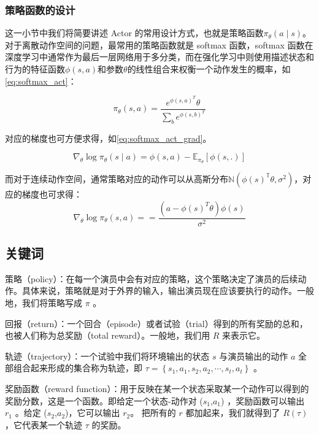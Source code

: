 \subsubsection{策略函数的设计}

这一小节中我们将简要讲述 Actor 的常用设计方式，也就是策略函数$\pi_\theta(a \mid s)$。 对于离散动作空间的问题，最常用的策略函数就是 softmax 函数，softmax 函数在深度学习中通常作为最后一层网络用于多分类，而在强化学习中则使用描述状态和行为的特征函数$\phi(s,a)$和参数$\theta$的线性组合来权衡一个动作发生的概率，如\eqref{eq:softmax_act}：


\begin{equation}
    \label{eq:softmax_act}
    \pi_\theta(s, a)=\frac{e^{\phi(s, a)^T} \theta}{\sum_b e^{\phi(s, b)^T}}
\end{equation}

对应的梯度也可方便求得，如\eqref{eq:softmax_act_grad}。

\begin{equation}
    \label{eq:softmax_act_grad}
    \nabla_\theta \log \pi_\theta(s \mid a)=\phi(s, a)-\mathbb{E}_{\pi_\theta}[\phi(s, .)]
\end{equation}

而对于连续动作空间，通常策略对应的动作可以从高斯分布${\mathbb{N}}\left(\phi(s)^{\mathbb{T}} \theta, \sigma^2\right)$，对应的梯度也可求得：
\begin{equation}
    \nabla_\theta \log \pi_\theta(s, a)==\frac{\left(a-\phi(s)^T \theta\right) \phi(s)}{\sigma^2}
\end{equation}

\subsection{关键词}

策略（policy）：在每一个演员中会有对应的策略，这个策略决定了演员的后续动作。具体来说，策略就是对于外界的输入，输出演员现在应该要执行的动作。一般地，我们将策略写成 $\pi$ 。

回报（return）：一个回合（episode）或者试验（trial）得到的所有奖励的总和，也被人们称为总奖励（total reward）。一般地，我们用 $R$ 来表示它。

轨迹（trajectory）：一个试验中我们将环境输出的状态 $s$ 与演员输出的动作 $a$ 全部组合起来形成的集合称为轨迹，即 $\tau=\left\{s_{1}, a_{1}, s_{2}, a_{2}, \cdots, s_{t}, a_{t}\right\}$ 。

奖励函数（reward function）：用于反映在某一个状态采取某一个动作可以得到的奖励分数，这是一个函数。即给定一个状态-动作对 ($s_1$,$a_1$) ，奖励函数可以输出 $r_1$ 。给定 ($s_2$,$a_2$)，它可以输出 $r_2$。 把所有的 $r$ 都加起来，我们就得到了 $R(\tau)$ ，它代表某一个轨迹 $\tau$ 的奖励。

